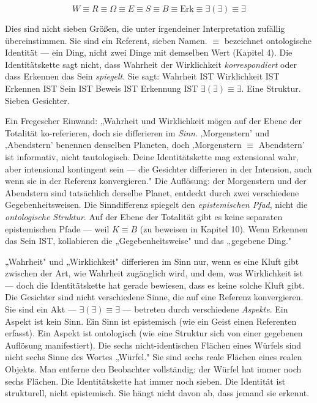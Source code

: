 \documentclass[10pt, openany, oneside]{book}
\begin{document}
\vspace{0.8em}

$$W \equiv R \equiv \Omega \equiv E \equiv S \equiv B \equiv \text{Erk} \equiv \exists(\exists) \equiv \exists$$

Dies sind nicht sieben Größen, die unter irgendeiner Interpretation zufällig übereinstimmen. Sie sind ein Referent, sieben Namen. $\equiv$ bezeichnet ontologische Identität --- ein Ding, nicht zwei Dinge mit demselben Wert (Kapitel 4). Die Identitätskette sagt nicht, dass Wahrheit der Wirklichkeit \textit{korrespondiert} oder dass Erkennen das Sein \textit{spiegelt}. Sie sagt: Wahrheit IST Wirklichkeit IST Erkennen IST Sein IST Beweis IST Erkennung IST $\exists(\exists) \equiv \exists$. Eine Struktur. Sieben Gesichter.

Ein Fregescher Einwand: „Wahrheit und Wirklichkeit mögen auf der Ebene der Totalität ko-referieren, doch sie differieren im \textit{Sinn}. ‚Morgenstern' und ‚Abendstern' benennen denselben Planeten, doch ‚Morgenstern $\equiv$ Abendstern' ist informativ, nicht tautologisch. Deine Identitätskette mag extensional wahr, aber intensional kontingent sein --- die Gesichter differieren in der Intension, auch wenn sie in der Referenz konvergieren." Die Auflösung: der Morgenstern und der Abendstern sind tatsächlich derselbe Planet, entdeckt durch zwei verschiedene Gegebenheitsweisen. Die Sinndifferenz spiegelt den \textit{epistemischen Pfad}, nicht die \textit{ontologische Struktur}. Auf der Ebene der Totalität gibt es keine separaten epistemischen Pfade --- weil $K \equiv B$ (zu beweisen in Kapitel 10). Wenn Erkennen das Sein IST, kollabieren die „Gegebenheitsweise" und das „gegebene Ding."

„Wahrheit" und „Wirklichkeit" differieren im Sinn nur, wenn es eine Kluft gibt zwischen der Art, wie Wahrheit zugänglich wird, und dem, was Wirklichkeit ist --- doch die Identitätskette hat gerade bewiesen, dass es keine solche Kluft gibt. Die Gesichter sind nicht verschiedene Sinne, die auf eine Referenz konvergieren. Sie sind ein Akt --- $\exists(\exists) \equiv \exists$ --- betreten durch verschiedene \textit{Aspekte}. Ein Aspekt ist kein Sinn. Ein Sinn ist epistemisch (wie ein Geist einen Referenten erfasst). Ein Aspekt ist ontologisch (wie eine Struktur sich von einer gegebenen Auflösung manifestiert). Die sechs nicht-identischen Flächen eines Würfels sind nicht sechs Sinne des Wortes „Würfel." Sie sind sechs reale Flächen eines realen Objekts. Man entferne den Beobachter vollständig: der Würfel hat immer noch sechs Flächen. Die Identitätskette hat immer noch sieben. Die Identität ist strukturell, nicht epistemisch. Sie hängt nicht davon ab, dass jemand sie erkennt.
\end{document}
